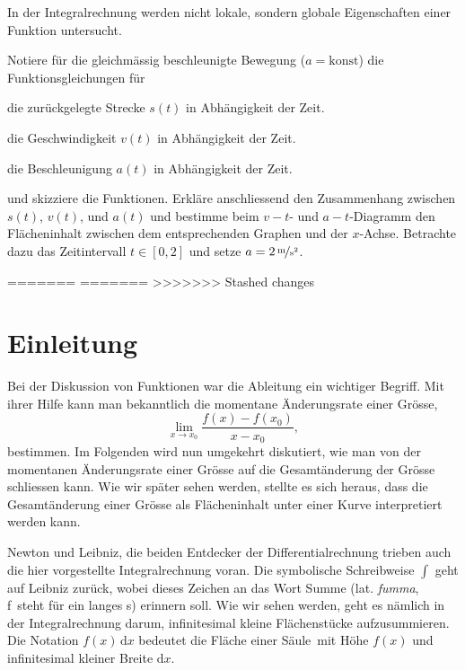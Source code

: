 \documentclass[%
<<<<<<< Updated upstream
<<<<<<< Updated upstream
11pt,%
twoside,%
titlepage,%
german,%
headsepline%
]{scrartcl}
\begin{document}
\begin{bem}
In der Integralrechnung werden nicht lokale, sondern globale Eigenschaften einer Funktion untersucht.
\end{bem}

\clearpage

\begin{ueb}[Standardbeispiel]
Notiere für die gleichmässig beschleunigte Bewegung ($a=\text{konst}$) die Funk\-tions\-glei\-chungen für
\begin{enumeratea}
\item die zurückgelegte Strecke $s(t)$ in Abhängigkeit der Zeit.
\item die Geschwindigkeit $v(t)$ in Abhängigkeit der Zeit.
\item die Beschleunigung $a(t)$ in Abhängigkeit der Zeit.
\end{enumeratea}
und skizziere die Funktionen. Erkläre anschliessend den Zusammenhang zwischen $s(t)$, $v(t)$, und $a(t)$ und bestimme beim $v-t$- und $a-t$-Diagramm den Flächeninhalt zwischen dem entsprechenden Graphen und der $x$-Achse. Betrachte dazu das Zeitintervall $t\in [0,2]$ und setze $a=\unitfrac[2]{m}{s^2}$.
\end{ueb}
=======
=======
>>>>>>> Stashed changes
\section{Einleitung}

Bei der Diskussion von Funktionen war die Ableitung ein wichtiger Begriff. Mit ihrer Hilfe kann man bekanntlich die momentane Änderungsrate einer Grösse,
$$\lim_{x\rightarrow x_0}\frac{f(x)-f(x_0)}{x-x_0},$$
bestimmen. Im Folgenden wird nun umgekehrt diskutiert, wie man von der momentanen Änderungsrate einer Grösse auf die Gesamtänderung der Grösse schliessen kann. Wie wir später sehen werden, stellte es sich heraus, dass die Gesamtänderung einer Grösse als Flächeninhalt unter einer Kurve interpretiert werden kann.

Newton und Leibniz, die beiden Entdecker der Differentialrechnung trieben auch die hier vorgestellte Integralrechnung voran. Die symbolische Schreibweise $\int$ geht auf Leibniz zurück, wobei dieses Zeichen an das Wort Summe (lat. \emph{fumma}, \glqq f\grqq\ steht für ein langes s) erinnern soll. Wie wir sehen werden, geht es nämlich in der Integralrechnung darum, infinitesimal kleine Flächenstücke aufzusummieren. Die Notation $f(x)\,\mathrm{d}x$ bedeutet die Fläche einer \glqq Säule\grqq\ mit Höhe $f(x)$ und infinitesimal kleiner Breite $\mathrm{d}x$.
\end{document}
